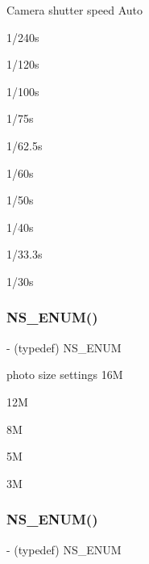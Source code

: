 Camera shutter speed Auto

1/240s

1/120s

1/100s

1/75s

1/62.\+5s

1/60s

1/50s

1/40s

1/33.\+3s

1/30s\mbox{\label{interface_p_v_eye_camera_settings_def_a0804cafe16d16724868c6405fa753c7a}} 
\subsubsection{\texorpdfstring{N\+S\+\_\+\+E\+N\+U\+M()}{NS\_ENUM()}\hspace{0.1cm}{\footnotesize\ttfamily [8/17]}}
{\footnotesize\ttfamily -\/ (typedef) N\+S\+\_\+\+E\+N\+UM \begin{DoxyParamCaption}\item[{(N\+S\+U\+Integer)}]{ }\item[{(P\+V\+Eye\+Camera\+Photo\+Size)}]{ }\end{DoxyParamCaption}}

photo size settings 16M

12M

8M

5M

3M\mbox{\label{interface_p_v_eye_camera_settings_def_ae9ab6adbb286e0178bdff73f30a67028}} 
\subsubsection{\texorpdfstring{N\+S\+\_\+\+E\+N\+U\+M()}{NS\_ENUM()}\hspace{0.1cm}{\footnotesize\ttfamily [9/17]}}
{\footnotesize\ttfamily -\/ (typedef) N\+S\+\_\+\+E\+N\+UM \begin{DoxyParamCaption}\item[{(N\+S\+U\+Integer)}]{ }\item[{(P\+V\+Eye\+Camera\+Photo\+Quality)}]{ }\end{DoxyParamCaption}}

